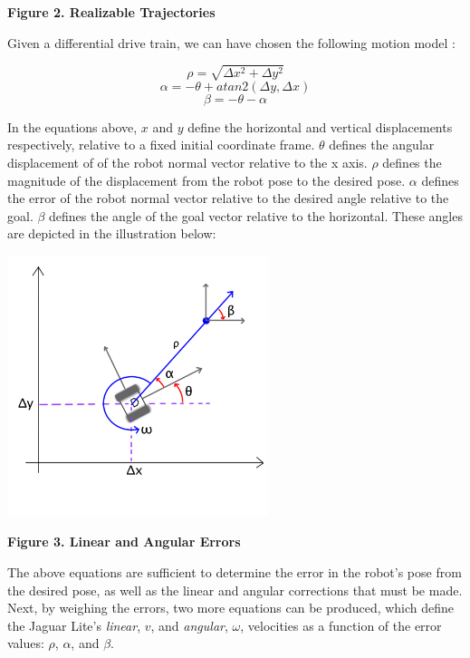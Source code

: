 \documentclass[conference]{IEEEtran}
\begin{document}
\textbf{Figure 2. Realizable Trajectories}

Given a differential drive train, we can have chosen the following motion model
\cite{Textbook}:

\begin{equation}
\rho = \sqrt{\Delta x^2 + \Delta y^2}
\end{equation}
\begin{equation}
\alpha = -\theta + atan2(\Delta y, \Delta x)
\end{equation}
\begin{equation}
\beta = -\theta -\alpha
\end{equation}

In the equations above, $x$ and $y$ define the horizontal and vertical displacements
respectively, relative to a fixed initial coordinate frame.  $\theta$ defines the 
angular displacement of of the robot normal vector relative to the x axis.  
$\rho$ defines the magnitude of the displacement from the robot pose to the 
desired pose.  $\alpha$ defines the error of the robot normal vector relative to 
the desired angle relative to the goal.  $\beta$ defines the angle of the goal vector 
relative to the horizontal.  These angles are depicted in the illustration below:

\includegraphics[width = 3in]{pic2.png}

\textbf{Figure 3. Linear and Angular Errors}

The above equations are sufficient to determine the error in the robot's pose from 
the desired pose, as well as the linear and angular corrections that must be made.  
Next, by weighing the errors, two more equations can be produced, which define the
Jaguar Lite's \emph{linear}, $v$, and \emph{angular}, $\omega$, velocities as a 
function of the error values: $\rho$, $\alpha$, and $\beta$.  
\end{document}
